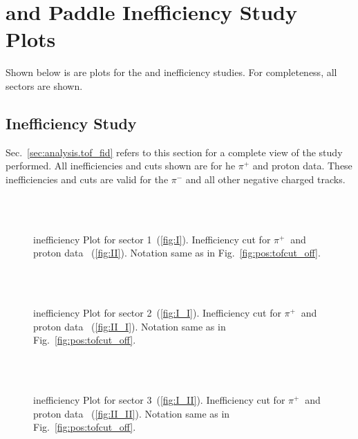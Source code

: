 \chapter{ and  Paddle Inefficiency Study Plots}\label{sec:app.tof_plots}

Shown below is are plots for the  and  inefficiency studies. For completeness, all sectors are shown.

\section{ Inefficiency Study}
Sec.~\ref{sec:analysis.tof_fid} refers to this section for a complete view of the  study performed. All inefficiencies and cuts shown are for he $\pi^+$ and proton data. These inefficiencies and cuts are valid for the $\pi^-$ and all other negative charged tracks.
\begin{figure}[!ht]
  \centering
   \quad
  \\
   \\

      \caption { inefficiency Plot for sector 1~(\ref{fig:I}). Inefficiency cut for $\pi^{+} \ $ and proton data ~(\ref{fig:II}). Notation same as in Fig.~\ref{fig:pos:tofcut_off}.}
        \label{fig:allI}
\end{figure}

\begin{figure}[!ht]
  \centering
   \quad
  \\
   \\

      \caption { inefficiency Plot for sector 2~(\ref{fig:I_I}). Inefficiency cut for $\pi^{+} \ $ and proton data ~(\ref{fig:II_I}). Notation same as in Fig.~\ref{fig:pos:tofcut_off}.}
        \label{fig:allI_I}
\end{figure}

\begin{figure}[!ht]
  \centering
   \quad
  \\
   \\

      \caption { inefficiency Plot for sector 3~(\ref{fig:I_II}). Inefficiency cut for $\pi^{+} \ $ and proton data ~(\ref{fig:II_II}). Notation same as in Fig.~\ref{fig:pos:tofcut_off}.}
        \label{fig:allI_II}
\end{figure}

